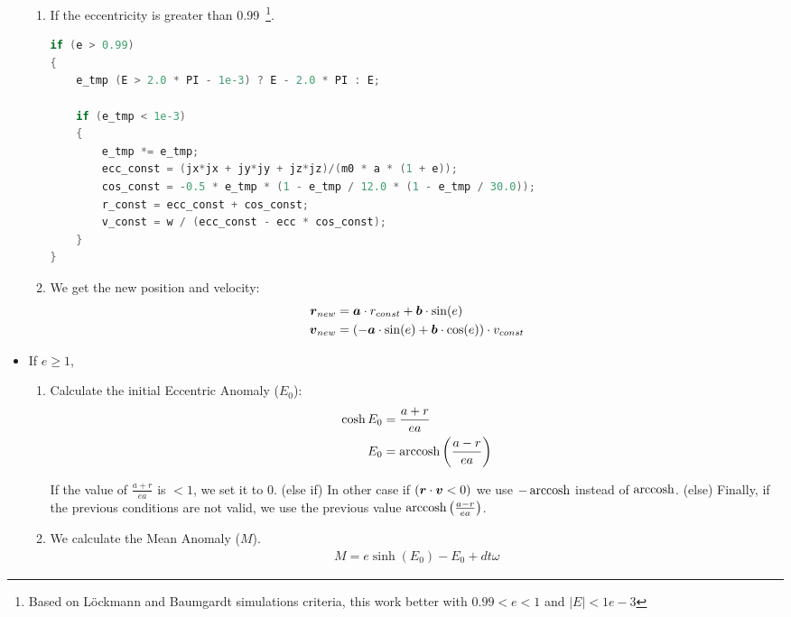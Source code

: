 \begin{itemize}
\begin{enumerate}
            \item If the eccentricity is greater than 0.99~\footnote{Based on
                  Löckmann and Baumgardt simulations criteria, this work better
                  with $0.99 < e < 1$ and $|E| < 1e-3$}.

            \begin{lstlisting}[language=C]
if (e > 0.99)
{
    e_tmp (E > 2.0 * PI - 1e-3) ? E - 2.0 * PI : E;

    if (e_tmp < 1e-3)
    {
        e_tmp *= e_tmp;
        ecc_const = (jx*jx + jy*jy + jz*jz)/(m0 * a * (1 + e));
        cos_const = -0.5 * e_tmp * (1 - e_tmp / 12.0 * (1 - e_tmp / 30.0));
        r_const = ecc_const + cos_const;
        v_const = w / (ecc_const - ecc * cos_const);
    }
}
            \end{lstlisting}

            \item We get the new position and velocity:
                \begin{align}
                    \boldsymbol{r}_{new} &= \boldsymbol{a}\cdot r_{const} + \boldsymbol{b} \cdot \sin(e) \\
                    \boldsymbol{v}_{new} &= (-\boldsymbol{a}\cdot \sin(e) + \boldsymbol{b}\cdot \cos(e)) \cdot v_{const}
                \end{align}
        \end{enumerate}


    \item If $e \geq 1$,
        \begin{enumerate}
            \item Calculate the initial Eccentric Anomaly ($E_{0}$):
                \begin{align}
                    \cosh{E_{0}} &= \frac{a+r}{e a} \\
                          E_{0} &= \operatorname{arccosh}{\left(\frac{a-r}{e a}\right)}
                \end{align}

                If the value of $\frac{a+r}{e a}$ is $< 1$, we set it
                to $0$.
                (else if) In other case if $(\boldsymbol{r}\cdot\boldsymbol{v} < 0)$ we use $-\operatorname{arccosh}$ instead
                of $\operatorname{arccosh}$.
                (else) Finally, if the previous conditions are not valid, we use the previous
                value $\operatorname{arccosh}{\left(\frac{a-r}{e a}\right)}$.

            \item We calculate the Mean Anomaly ($M$).
                \begin{align}
                    M = e \sinh(E_{0}) - E_{0} + dt\omega
                \end{align}


\end{enumerate}
\end{itemize}
